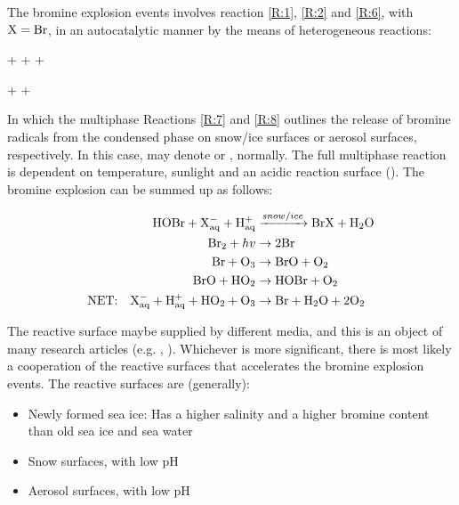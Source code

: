 The bromine explosion events involves reaction \ref{R:1}, \ref{R:2} and \ref{R:6}, with $\mathrm{X} = \mathrm{Br}$, in an autocatalytic manner by the means of heterogeneous reactions: 

\begin{reaction}
     +  +    +  \label{R:7} 
\end{reaction}
\begin{reaction}
     +    +  \label{R:8}
\end{reaction}



In which the multiphase Reactions \ref{R:7} and \ref{R:8} outlines the release of bromine radicals from the condensed phase on snow/ice surfaces or aerosol surfaces, respectively. In this case,  may denote  or , normally. The full multiphase reaction is dependent on temperature, sunlight and an acidic reaction surface (\cite{Toyota}). The bromine explosion can be summed up as follows: 

\begin{align*}
    \mathrm{HOBr} + \mathrm{X^-_{aq}} + \mathrm{H^+_{aq}} &\xrightarrow{snow/ice} \mathrm{BrX} + \mathrm{H_2O} \\
    \mathrm{Br_2} + hv &\rightarrow 2\mathrm{Br} \\
    \mathrm{Br} + \mathrm{O_3} &\rightarrow \mathrm{BrO} + \mathrm{O_2} \\
    \mathrm{BrO} + \mathrm{HO_2} &\rightarrow \mathrm{HOBr} + \mathrm{O_2} \\
    \text{NET:} \quad \mathrm{X^-_{aq}} + \mathrm{H^+_{aq}} + \mathrm{HO_2} + \mathrm{O_3}  &\rightarrow \mathrm{Br} + \mathrm{H_2O} + 2\mathrm{O_2} 
\end{align*}

\medskip

The reactive surface maybe supplied by different media, and this is an object of many research articles (e.g.  \cite{Simpson2018}, \cite{Rankin}). Whichever is more significant, there is most likely a cooperation of the reactive surfaces that accelerates the bromine explosion events. The reactive surfaces are (generally): 

\begin{itemize}
    \item Newly formed sea ice: Has a higher salinity and a higher bromine content than old sea ice and sea water \cite{Rankin}
    \item Snow surfaces, with low pH
    \item Aerosol surfaces, with low pH
\end{itemize}

